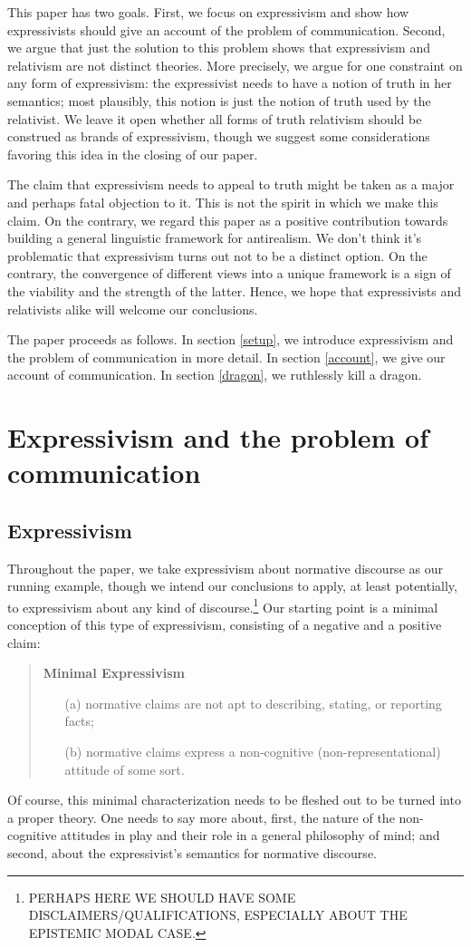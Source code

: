 \documentclass[11pt,article,oneside]{memoir}
\begin{document}
This paper has two goals. First, we focus on expressivism and show how expressivists should give an account of the problem of communication. Second, we argue that just the solution to this problem shows that expressivism and relativism are not distinct theories. More precisely, we argue for one constraint on any form of expressivism: the expressivist needs to have a notion of truth in her semantics; most plausibly, this notion is just the notion of truth used by the relativist. We leave it open whether all forms of truth relativism should be construed as brands of expressivism, though we suggest some considerations favoring this idea in the closing of our paper.

The claim that expressivism needs to appeal to truth might be taken as a major and perhaps fatal objection to it. This is not the spirit in which we make this claim. On the contrary, we regard this paper as a positive contribution towards building a general linguistic framework for antirealism. We don't think it's problematic that expressivism turns out not to be a distinct option. On the contrary, the convergence of different views into a unique framework is a sign of the viability and the strength of the latter. Hence, we hope that expressivists and relativists alike will welcome our conclusions. 

The paper proceeds as follows. In section \ref{setup}, we introduce expressivism and the problem of communication in more detail. In section \ref{account}, we give our account of communication. In section \ref{dragon}, we ruthlessly kill a dragon.

\section{Expressivism and the problem of communication}

\subsection{Expressivism}
Throughout the paper, we take expressivism about normative discourse as our running example, though we intend our conclusions to apply, at least potentially, to expressivism about any kind of discourse.\footnote{PERHAPS HERE WE SHOULD HAVE SOME DISCLAIMERS/QUALIFICATIONS, ESPECIALLY ABOUT THE EPISTEMIC MODAL CASE.} Our starting point is a minimal conception of this type of expressivism, consisting of a negative and a positive claim: 
\begin{quote}
\textbf{Minimal Expressivism}
\begin{itemize}
\item[(a)] normative claims are not apt to describing, stating, or reporting facts; 
\item[(b)] normative claims express a non-cognitive (non-representational) attitude of some sort. 
\end{itemize}
\end{quote}
Of course, this minimal characterization needs to be fleshed out to be turned into a proper theory. One needs to say more about, first, the nature of the non-cognitive attitudes in play and their role in a general philosophy of mind; and second, about the expressivist's semantics for normative discourse. 
\end{document}
